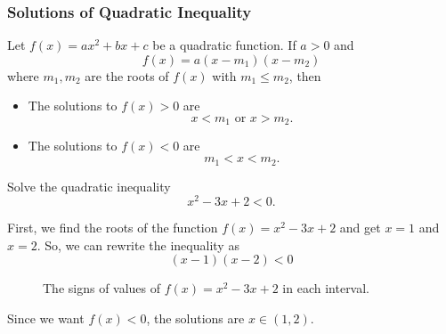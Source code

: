 \begin{frame}
\frametitle{Solutions of Quadratic Inequality}
\begin{thm}{}{}
Let $f(x) = ax^2 + bx + c$ be a quadratic function. If $a>0$ and 
\[f(x) = a(x-m_1)(x-m_2)\]
where $m_1, m_2$ are the roots of $f(x)$ with $m_1 \leq m_2$, then 
\begin{itemize}
\item The solutions to $f(x) > 0$ are
\[x < m_1 \text{ or } x > m_2.\] 
\item The solutions to $f(x) < 0$ are
\[m_1 < x < m_2.\] 
\end{itemize}
\end{thm}
\end{frame}


\begin{frame}[t]
\begin{ex}
Solve the quadratic inequality
\[x^2 - 3x + 2 < 0.\]
\end{ex}
\begin{sol}
First, we find the roots of the function $f(x) = x^2-3x+2$ and get $x = 1$ and $x=2$. So, we can rewrite the inequality as
\[(x-1)(x-2) < 0\]
\end{sol}
\end{frame}

\begin{frame}
\begin{sol}
\begin{figure}[h!]
\centering
{}
\caption{The signs of values of $f(x)=x^2-3x+2$ in each interval.}
\end{figure}
Since we want $f(x) < 0$, the solutions are $x \in (1,2)$.
\end{sol}
\end{frame}


